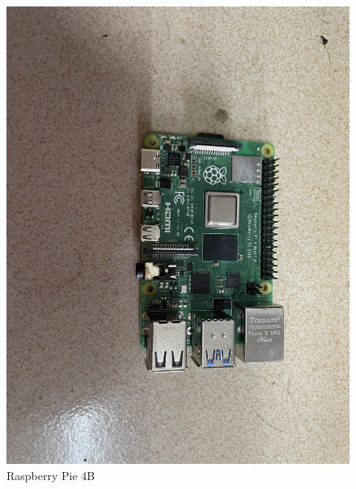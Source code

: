 \documentclass{hci}
\begin{document}
\begin{figure}[htbp]
	\centering
	\includegraphics[width=1\linewidth]{figures/RP}
	\caption{Raspberry Pie 4B}
	\label{fig:RP}
\end{figure}
\end{document}
